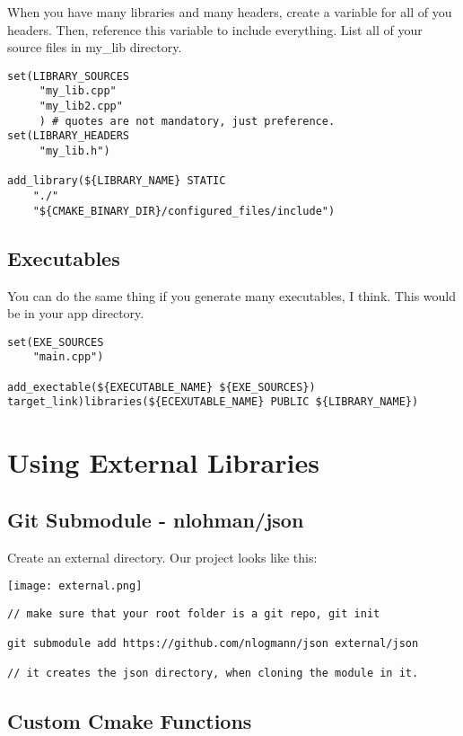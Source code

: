 When you have many libraries and many headers, create a variable for all of you headers. Then, reference this variable to include
everything. List all of your source files in my\_lib directory.

\begin{verbatim}
set(LIBRARY_SOURCES
     "my_lib.cpp"
     "my_lib2.cpp"
     ) # quotes are not mandatory, just preference.
set(LIBRARY_HEADERS
     "my_lib.h")

add_library(${LIBRARY_NAME} STATIC
    "./"
    "${CMAKE_BINARY_DIR}/configured_files/include")
\end{verbatim}

\subsection{Executables}

You can do the same thing if you generate many executables, I think. This would be in your app directory.

\begin{verbatim}
set(EXE_SOURCES
    "main.cpp")

add_exectable(${EXECUTABLE_NAME} ${EXE_SOURCES})
target_link)libraries(${ECEXUTABLE_NAME} PUBLIC ${LIBRARY_NAME})
\end{verbatim}


\section{Using External Libraries}


\subsection{Git Submodule - nlohman/json}

Create an external directory. Our project looks like this:

\begin{center}
    \texttt{[image: external.png]}
\end{center}

\begin{verbatim}
// make sure that your root folder is a git repo, git init

git submodule add https://github.com/nlogmann/json external/json

// it creates the json directory, when cloning the module in it.
\end{verbatim}

\subsection{Custom Cmake Functions}

